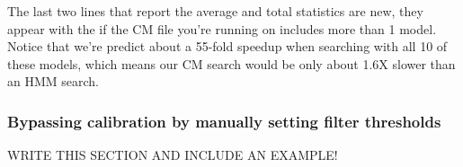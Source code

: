 The last two lines that report the average and total statistics are
new, they appear with the  if the
CM file you're running   on includes more than 1 model. 
Notice that we're predict about a 55-fold speedup when searching with
all 10 of these models, which means our CM search would be only about
1.6X slower than an HMM search.

\subsubsection{Bypassing calibration by manually setting filter
  thresholds}

WRITE THIS SECTION AND INCLUDE AN EXAMPLE!

